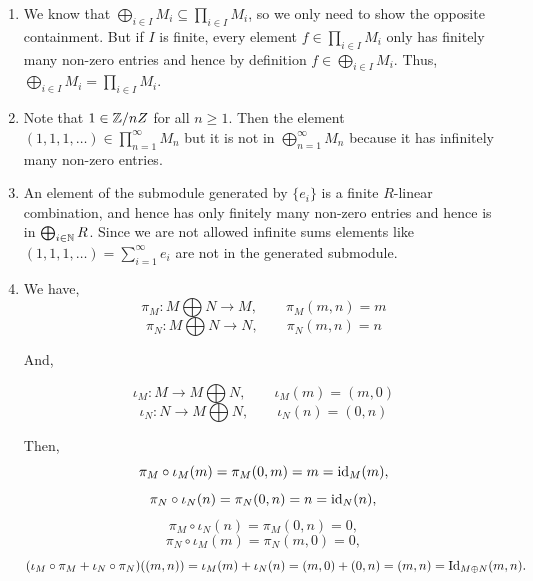 \documentclass[Notebook.tex]{subfiles}
\begin{document}
\begin{solution}
\begin{enumerate}
            \item We know that $\bigoplus_{i\in I}M_i \subseteq \prod_{i \in I}M_i$, so we only need to show the opposite containment. But if $I$ is finite, every element $f \in \prod_{i \in I} M_i$ only has finitely many non-zero entries and hence by definition $f \in \bigoplus_{i\in I}M_i$. Thus, $\bigoplus_{i\in I}M_i = \prod_{i \in I}M_i$. 
            
            \item Note that $1 \in \mathbb Z/nZ$ for all $n \geq 1$. Then the element $(1, 1, 1, \ldots) \in \prod_{n = 1}^\infty M_n$ but it is not in $\bigoplus_{n = 1}^\infty M_n$ because it has infinitely many non-zero entries. 
            
            \item An element of the submodule generated by $\{e_i\}$ is a finite $R$-linear combination, and hence has only finitely many non-zero entries and hence is in $\bigoplus_{i \in \mathbb N}R$. Since we are not allowed infinite sums elements like $(1, 1,1, \ldots) = \sum_{i = 1}^\infty e_i$ are not in the generated submodule. 
            
            \item We have, 
            \[\pi_M : M \bigoplus N \to M, \qquad  \pi_M(m, n) = m \]
            \[\pi_N : M \bigoplus N \to N, \qquad  \pi_N(m, n) = n \]

            And, 

            \[\iota_M : M \to M \bigoplus N , \qquad  \iota_M(m) = (m,0) \]
            \[\iota_N : N \to M \bigoplus N , \qquad  \iota_N(n) = (0, n) \]

            Then, 
            \[\pi_M \circ \iota_M (m) = \pi_M(0, m) = m = \operatorname{id}_M(m),\]
            \[\pi_N \circ \iota_N (n) = \pi_N(0, n) = n = \operatorname{id}_N(n),\]
            \[\pi_M \circ \iota_N (n) = \pi_M(0, n) = 0,\]
            \[\pi_N \circ \iota_M (m) = \pi_N(m, 0) = 0,\]
            \[(\iota_M\circ \pi_M+\iota_N\circ \pi_N) ((m, n))= \iota_M (m) + \iota_N(n) = (m, 0) + (0,n) = (m, n) = \operatorname{Id}_{M\oplus N}(m, n).\]
        \end{enumerate}
    \end{solution}

    \newpage 
\end{document}
